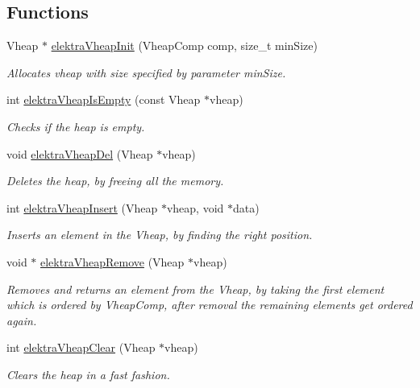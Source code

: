 \subsection*{Functions}
\begin{DoxyCompactItemize}
\item 
Vheap $\ast$ \hyperlink{group__vheap_gaa57ffd6ed456de1b80d08a9c0cd0dc38}{elektra\+Vheap\+Init} (Vheap\+Comp comp, size\+\_\+t min\+Size)
\begin{DoxyCompactList}\small\item\em Allocates vheap with size specified by parameter min\+Size. \end{DoxyCompactList}\item 
int \hyperlink{group__vheap_gac300479bc8306d462346e9d27ad67d0f}{elektra\+Vheap\+Is\+Empty} (const Vheap $\ast$vheap)
\begin{DoxyCompactList}\small\item\em Checks if the heap is empty. \end{DoxyCompactList}\item 
\hypertarget{group__vheap_gad26b7fd706901a5c3a3f172f7147e711}{void \hyperlink{group__vheap_gad26b7fd706901a5c3a3f172f7147e711}{elektra\+Vheap\+Del} (Vheap $\ast$vheap)}\label{group__vheap_gad26b7fd706901a5c3a3f172f7147e711}

\begin{DoxyCompactList}\small\item\em Deletes the heap, by freeing all the memory. \end{DoxyCompactList}\item 
int \hyperlink{group__vheap_ga038490c3f8458b51c916d1d8bb496e86}{elektra\+Vheap\+Insert} (Vheap $\ast$vheap, void $\ast$data)
\begin{DoxyCompactList}\small\item\em Inserts an element in the Vheap, by finding the right position. \end{DoxyCompactList}\item 
void $\ast$ \hyperlink{group__vheap_gad2f5b57d9f3acef8c7679eb1795ca436}{elektra\+Vheap\+Remove} (Vheap $\ast$vheap)
\begin{DoxyCompactList}\small\item\em Removes and returns an element from the Vheap, by taking the first element which is ordered by Vheap\+Comp, after removal the remaining elements get ordered again. \end{DoxyCompactList}\item 
int \hyperlink{group__vheap_ga972b02276df378c46d8966726c2b337c}{elektra\+Vheap\+Clear} (Vheap $\ast$vheap)
\begin{DoxyCompactList}\small\item\em Clears the heap in a fast fashion. \end{DoxyCompactList}\end{DoxyCompactItemize}


